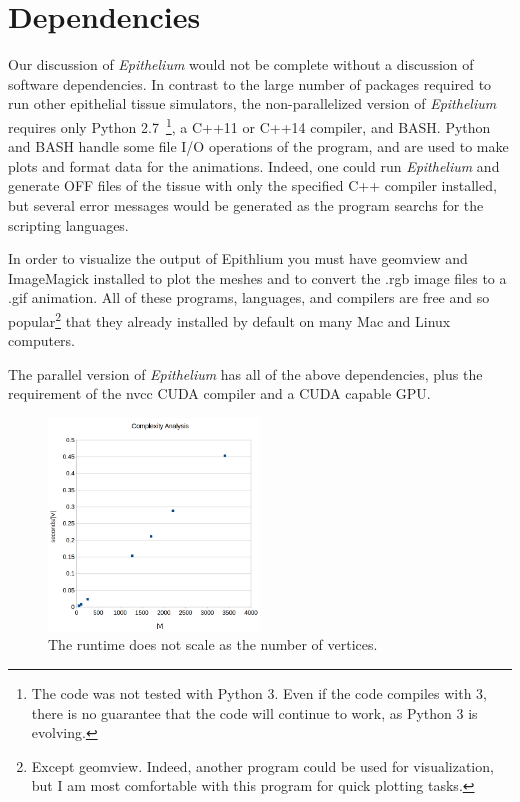 \section{Dependencies}
Our discussion of \emph{Epithelium} would not be complete without a discussion of software dependencies. In contrast to the large number of packages required to run other epithelial tissue simulators, the non-parallelized version of \emph{Epithelium} requires only Python 2.7~\footnote{The code was not tested with Python 3. Even if the code compiles with 3, there is no guarantee that the code will continue to work, as Python 3 is evolving.}, a C++11 or C++14 compiler, and BASH. Python and BASH handle some file I/O operations of the program, and are used to make plots and format data for the animations. Indeed, one could run \emph{Epithelium} and generate OFF files of the tissue with only the specified C++ compiler installed, but several error messages would be generated as the program searchs for the scripting languages.

In order to visualize the output of Epithlium you must have geomview and ImageMagick installed to plot the meshes and to convert the .rgb image files to a .gif animation. All of these programs, languages, and compilers are free and so popular\footnote{Except geomview. Indeed, another program could be used for visualization, but I am most comfortable with this program for quick plotting tasks.} that they already installed by default on many Mac and Linux computers. 

The parallel version of \emph{Epithelium} has all of the above dependencies, plus the requirement of the nvcc CUDA compiler and a CUDA capable GPU. 

\begin{figure}
\centering
\includegraphics[width=0.5\textwidth]{../diagrams/v.png}
\caption{The runtime does not scale as the number of vertices.}
\label{fig:v}
\end{figure}


